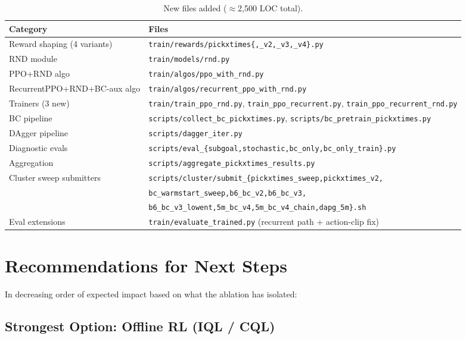 \documentclass[11pt,letterpaper]{article}
\begin{document}
\begin{table}[H]
\centering
\begin{tabular}{ll}
\toprule
\textbf{Category} & \textbf{Files} \\
\midrule
Reward shaping (4 variants)
& \texttt{train/rewards/pickxtimes\{,\_v2,\_v3,\_v4\}.py} \\
RND module
& \texttt{train/models/rnd.py} \\
PPO+RND algo
& \texttt{train/algos/ppo\_with\_rnd.py} \\
RecurrentPPO+RND+BC-aux algo
& \texttt{train/algos/recurrent\_ppo\_with\_rnd.py} \\
Trainers (3 new)
& \texttt{train/train\_ppo\_rnd.py}, \texttt{train\_ppo\_recurrent.py},
  \texttt{train\_ppo\_recurrent\_rnd.py} \\
BC pipeline
& \texttt{scripts/collect\_bc\_pickxtimes.py},
  \texttt{scripts/bc\_pretrain\_pickxtimes.py} \\
DAgger pipeline
& \texttt{scripts/dagger\_iter.py} \\
Diagnostic evals
& \texttt{scripts/eval\_\{subgoal,stochastic,bc\_only,bc\_only\_train\}.py} \\
Aggregation
& \texttt{scripts/aggregate\_pickxtimes\_results.py} \\
Cluster sweep submitters
& \texttt{scripts/cluster/submit\_\{pickxtimes\_sweep,pickxtimes\_v2,}\\
& \quad\texttt{bc\_warmstart\_sweep,b6\_bc\_v2,b6\_bc\_v3,}\\
& \quad\texttt{b6\_bc\_v3\_lowent,5m\_bc\_v4,5m\_bc\_v4\_chain,dapg\_5m\}.sh} \\
Eval extensions
& \texttt{train/evaluate\_trained.py} (recurrent path + action-clip fix) \\
\bottomrule
\end{tabular}
\caption{New files added ($\approx$2{,}500 LOC total).}
\end{table}

\section{Recommendations for Next Steps}
\label{sec:nextsteps}

In decreasing order of expected impact based on what the ablation has isolated:

\subsection{Strongest Option: Offline RL (IQL / CQL)}
\end{document}

